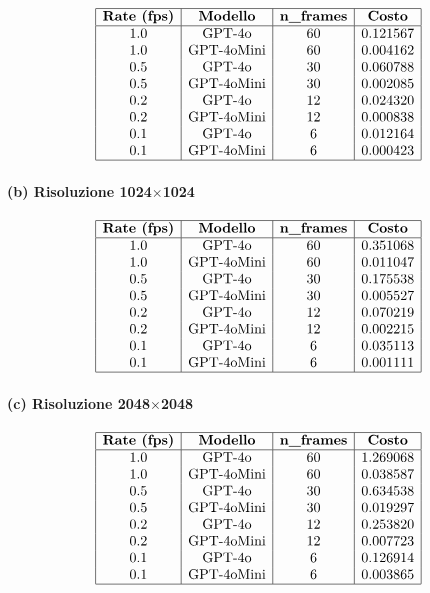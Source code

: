 \documentclass[a4paper,12pt]{article}
\begin{document}
\[
\begin{array}{|c|c|c|c|}
\hline
\textbf{Rate (fps)} & \textbf{Modello} & \textbf{n\_frames} & \textbf{Costo}\\
\hline
1.0 & \text{GPT-4o}     & 60 & 0.121567\\
1.0 & \text{GPT-4oMini} & 60 & 0.004162\\
0.5 & \text{GPT-4o}     & 30 & 0.060788\\
0.5 & \text{GPT-4oMini} & 30 & 0.002085\\
0.2 & \text{GPT-4o}     & 12 & 0.024320\\
0.2 & \text{GPT-4oMini} & 12 & 0.000838\\
0.1 & \text{GPT-4o}     & 6  & 0.012164\\
0.1 & \text{GPT-4oMini} & 6  & 0.000423\\
\hline
\end{array}
\]

\paragraph{(b) Risoluzione 1024$\times$1024}

\[
\begin{array}{|c|c|c|c|}
\hline
\textbf{Rate (fps)} & \textbf{Modello} & \textbf{n\_frames} & \textbf{Costo}\\
\hline
1.0 & \text{GPT-4o}     & 60 & 0.351068\\
1.0 & \text{GPT-4oMini} & 60 & 0.011047\\
0.5 & \text{GPT-4o}     & 30 & 0.175538\\
0.5 & \text{GPT-4oMini} & 30 & 0.005527\\
0.2 & \text{GPT-4o}     & 12 & 0.070219\\
0.2 & \text{GPT-4oMini} & 12 & 0.002215\\
0.1 & \text{GPT-4o}     & 6  & 0.035113\\
0.1 & \text{GPT-4oMini} & 6  & 0.001111\\
\hline
\end{array}
\]

\paragraph{(c) Risoluzione 2048$\times$2048}

\[
\begin{array}{|c|c|c|c|}
\hline
\textbf{Rate (fps)} & \textbf{Modello} & \textbf{n\_frames} & \textbf{Costo}\\
\hline
1.0 & \text{GPT-4o}     & 60 & 1.269068\\
1.0 & \text{GPT-4oMini} & 60 & 0.038587\\
0.5 & \text{GPT-4o}     & 30 & 0.634538\\
0.5 & \text{GPT-4oMini} & 30 & 0.019297\\
0.2 & \text{GPT-4o}     & 12 & 0.253820\\
0.2 & \text{GPT-4oMini} & 12 & 0.007723\\
0.1 & \text{GPT-4o}     & 6  & 0.126914\\
0.1 & \text{GPT-4oMini} & 6  & 0.003865\\
\hline
\end{array}
\]
\end{document}
